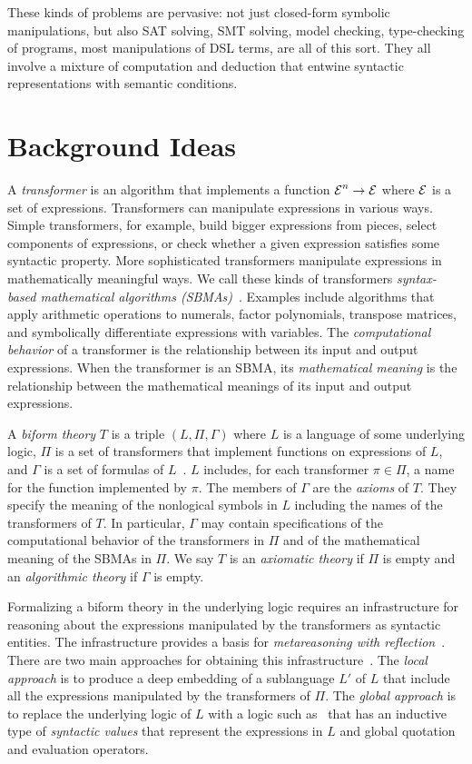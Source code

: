 \documentclass[fleqn]{llncs}
\begin{document}
These kinds of problems are pervasive: not just closed-form symbolic
manipulations, but also SAT solving, SMT solving, model checking,
type-checking of programs, most manipulations of DSL terms, are all
of this sort.  They all involve a mixture of computation and deduction
that entwine syntactic representations with semantic conditions.

\section{Background Ideas}

A \emph{transformer} is an algorithm that implements a function $\mbox{$\cal E$}^n
\rightarrow \mbox{$\cal E$}$ where $\mbox{$\cal E$}$ is a set of expressions.  Transformers can
manipulate expressions in various ways.  Simple transformers, for
example, build bigger expressions from pieces, select components of
expressions, or check whether a given expression satisfies some
syntactic property.  More sophisticated transformers manipulate
expressions in mathematically meaningful ways.  We call these kinds of
transformers \emph{syntax-based mathematical algorithms
  (SBMAs)}~\cite{Farmer13}.  Examples include algorithms that apply
arithmetic operations to numerals, factor polynomials, transpose
matrices, and symbolically differentiate expressions with variables.
The \emph{computational behavior} of a transformer is the relationship
between its input and output expressions.  When the transformer is an
SBMA, its \emph{mathematical meaning} is the relationship between the
mathematical meanings of its input and output expressions.

A \emph{biform theory} $T$ is a triple $(L,\Pi,\Gamma)$ where $L$ is a
language of some underlying logic, $\Pi$ is a set of transformers that
implement functions on expressions of $L$, and $\Gamma$ is a set of
formulas of
$L$~\cite{CaretteFarmer08,Farmer07b,FarmerMohrenschildt03}.  $L$
includes, for each transformer $\pi \in \Pi$, a name for the function
implemented by $\pi$.  The members of $\Gamma$ are the \emph{axioms}
of $T$.  They specify the meaning of the nonlogical symbols in $L$
including the names of the transformers of $T$.  In particular,
$\Gamma$ may contain specifications of the computational behavior of
the transformers in $\Pi$ and of the mathematical meaning of the SBMAs
in $\Pi$.  We say $T$ is an \emph{axiomatic theory} if $\Pi$ is empty
and an \emph{algorithmic theory} if $\Gamma$ is empty.

Formalizing a biform theory in the underlying logic requires an
infrastructure for reasoning about the expressions manipulated by the
transformers as syntactic entities.  The infrastructure provides a
basis for \emph{metareasoning with reflection}~\cite{FarmerArxiv16}.
There are two main approaches for obtaining this
infrastructure~\cite{Farmer13}.  The \emph{local approach} is to
produce a deep embedding of a sublanguage $L'$ of $L$ that include all
the expressions manipulated by the transformers of $\Pi$.  The
\emph{global approach} is to replace the underlying logic of $L$ with
a logic such as~\cite{FarmerArxiv16} that has an inductive
type of \emph{syntactic values} that represent the expressions in $L$
and global quotation and evaluation operators.
\end{document}

